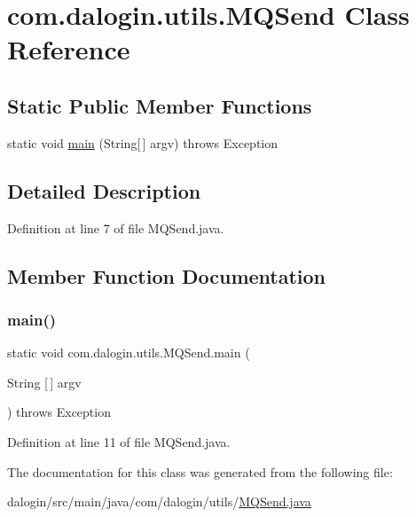 \hypertarget{classcom_1_1dalogin_1_1utils_1_1_m_q_send}{}\section{com.\+dalogin.\+utils.\+M\+Q\+Send Class Reference}
\label{classcom_1_1dalogin_1_1utils_1_1_m_q_send}
\subsection*{Static Public Member Functions}
\begin{DoxyCompactItemize}
\item 
static void \hyperlink{classcom_1_1dalogin_1_1utils_1_1_m_q_send_ad784ec93f30b17b9c08d2f1219c5ae01}{main} (String\mbox{[}$\,$\mbox{]} argv)  throws Exception 
\end{DoxyCompactItemize}


\subsection{Detailed Description}


Definition at line 7 of file M\+Q\+Send.\+java.



\subsection{Member Function Documentation}
\mbox{\label{classcom_1_1dalogin_1_1utils_1_1_m_q_send_ad784ec93f30b17b9c08d2f1219c5ae01}} 
\subsubsection{\texorpdfstring{main()}{main()}}
{\footnotesize\ttfamily static void com.\+dalogin.\+utils.\+M\+Q\+Send.\+main (\begin{DoxyParamCaption}\item[{String \mbox{[}$\,$\mbox{]}}]{argv }\end{DoxyParamCaption}) throws Exception\hspace{0.3cm}{\ttfamily [static]}}



Definition at line 11 of file M\+Q\+Send.\+java.



The documentation for this class was generated from the following file\+:\begin{DoxyCompactItemize}
\item 
dalogin/src/main/java/com/dalogin/utils/\hyperlink{_m_q_send_8java}{M\+Q\+Send.\+java}\end{DoxyCompactItemize}
